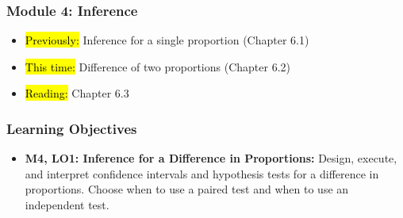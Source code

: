 
\begin{frame}
    \frametitle{Module 4: Inference}
    \begin{itemize}
        \item \hl{Previously: }Inference for a single proportion (Chapter 6.1)
        \item \hl{This time: }Difference of two proportions (Chapter 6.2)
        \item \hl{Reading: }Chapter 6.3
    \end{itemize}

\end{frame}
\begin{frame}
    \frametitle{Learning Objectives}
    \begin{itemize}
        \item \textbf{M4, LO1: Inference for a Difference in Proportions:} Design, execute, and interpret confidence intervals and hypothesis tests for a difference in proportions. Choose when to use a paired test and when to use an independent test.
    \end{itemize}
\end{frame}
